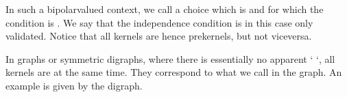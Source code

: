\documentclass[a4paper,12pt,english]{sphinxhowto}
\begin{document}
In such a  bipolar\sphinxhyphen{}valued context, we call  a choice which is  and for which the  condition is . We say that the independence condition is in this case only  validated. Notice that all kernels are hence prekernels, but not vice\sphinxhyphen{}versa.

In graphs or symmetric digraphs, where there is essentially no apparent ‘  ‘, all kernels are    at the same time. They correspond to what we call  in the graph. An  example is given by the  digraph.
\end{document}
